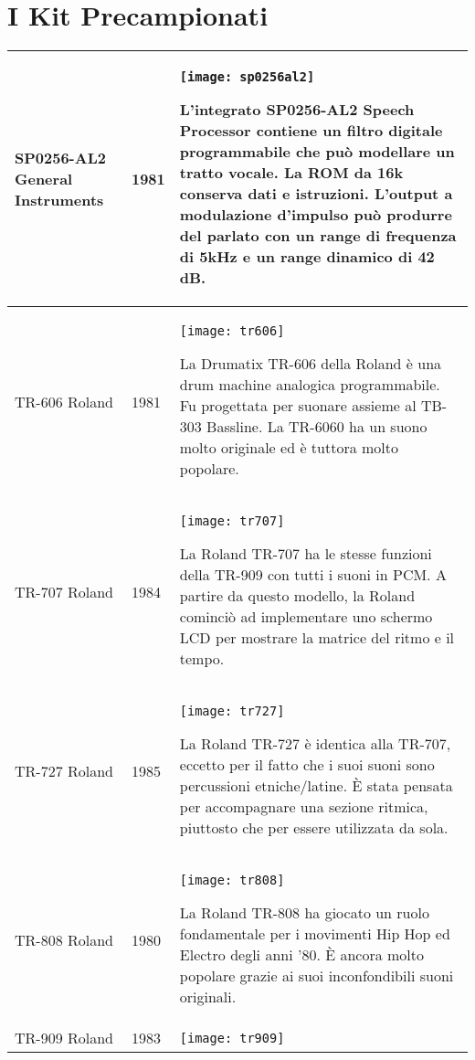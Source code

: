 \chapter{I Kit Precampionati}


\tablelasttail{ \hline }
\begin{xtabular}{p{2.02cm}|l|p{7.8cm}}

\hline
SP0256-AL2 \linebreak
General Instruments 
& 1981 & 
\texttt{[image: sp0256al2]}

L’integrato SP0256-AL2 Speech Processor contiene un filtro digitale programmabile che può modellare un tratto vocale. La ROM da 16k conserva dati e istruzioni. L’output a modulazione d'impulso può produrre del parlato con un range di frequenza di 5kHz e un range dinamico di 42 dB. \\
\hline
TR-606 \linebreak Roland & 1981 & 
\texttt{[image: tr606]}

La Drumatix TR-606 della Roland è una drum machine analogica programmabile. Fu progettata per suonare assieme al TB-303 Bassline. La TR-6060 ha un suono molto originale ed è tuttora molto popolare. \\
\hline
TR-707 \linebreak Roland & 1984 & 
\texttt{[image: tr707]}

La Roland TR-707 ha le stesse funzioni della TR-909 con tutti i suoni in PCM. A partire da questo modello, la Roland cominciò ad implementare uno schermo LCD per mostrare la matrice del ritmo e il tempo. \\
\hline
TR-727 \linebreak Roland & 1985 & 
\texttt{[image: tr727]}

La Roland TR-727 è identica alla TR-707, eccetto per il fatto che i suoi suoni sono percussioni etniche/latine. È stata pensata per accompagnare una sezione ritmica, piuttosto che per essere utilizzata da sola. \\
\hline
TR-808 \linebreak Roland & 1980 & 
\texttt{[image: tr808]}

La Roland TR-808 ha giocato un ruolo fondamentale per i movimenti Hip Hop ed Electro degli anni ’80. È ancora molto popolare grazie ai suoi inconfondibili suoni originali. \\
\hline
TR-909 \linebreak Roland & 1983 & 
\texttt{[image: tr909]}


\end{xtabular}
